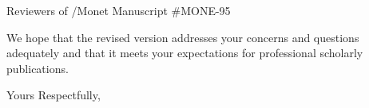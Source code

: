 \documentclass{letter}
\begin{document}
\begin{letter}{Reviewers of /Monet Manuscript \#MONE-95}
% 

We hope that the revised version addresses your concerns and questions adequately and that it meets your expectations for professional scholarly publications.

\closing{Yours Respectfully,}
\signature{Stefan~Karpinski}

\vfill



\end{letter}
\end{document}
